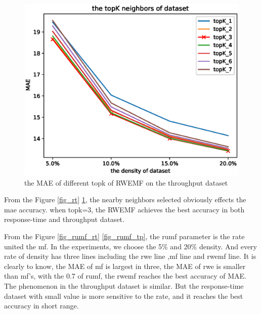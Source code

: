 \documentclass[conference]{IEEEtran}
\begin{document}
\begin{figure}[H] 
\centering  
\includegraphics[width=0.45\paperwidth]{topk_tp.eps}  
\caption{the MAE of different topk of RWEMF on the throughput dataset }  
\label{fig_tp}  
\end{figure} 



\par From the Figure \ref{fig_rt} \ref{fig_tp}, the nearby neighbors selected obviously effects the mae accuracy. when topk=3, the RWEMF achieves the best accuracy in both response-time and throughput dataset. 

\par From the Figure \ref{fig_rumf_rt} \ref{fig_rumf_tp}, the rumf parameter is the rate united the mf. In the experiments, we choose the 5\% and 20\% density. And every rate of density has three lines including the rwe line ,mf line and rwemf line. It is clearly to know, the MAE of mf is largest in three, the MAE of rwe is smaller than mf's, with the 0.7 of rumf, the rwemf reaches the best accuracy of MAE. The phenomenon in the throughput dataset is similar. But the response-time dataset with small value is more sensitive to the rate, and it reaches the best accuracy in short range. 
\end{document}
